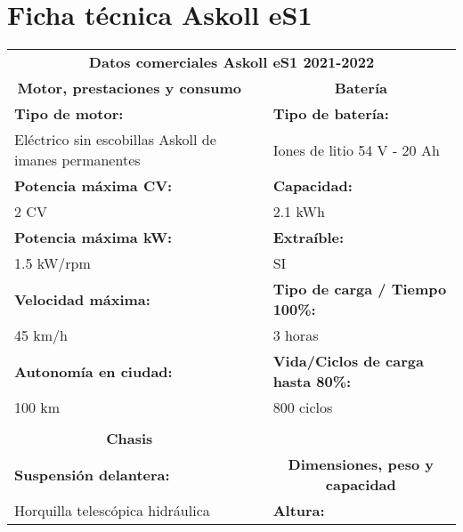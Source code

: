 \newpage
\section{Ficha técnica Askoll eS1}
\label{anexo:ficha tecnica askoll}


\begin{table}[H]
\centering
\begin{tabular}{lll}
\multicolumn{3}{c}{\textbf{Datos comerciales Askoll eS1 2021-2022}}                \\\cline{1-3}
\multicolumn{1}{c}{\textbf{Motor, prestaciones y consumo}} &  & \multicolumn{1}{c}{\textbf{Batería}}                       \\ \cline{1-1} \cline{3-3} 
\textbf{Tipo de motor:}             &  & \textbf{Tipo de batería:}                 \\
Eléctrico sin escobillas Askoll de imanes permanentes      &  & Iones de litio 54 V - 20 Ah                                \\
\textbf{Potencia máxima CV:}        &  & \textbf{Capacidad:}                       \\
2 CV                                &  & 2.1 kWh                                   \\
\textbf{Potencia máxima kW:}        &  & \textbf{Extraíble:}                       \\
1.5 kW/rpm                          &  & SI                                        \\
\textbf{Velocidad máxima:}          &  & \textbf{Tipo de carga / Tiempo 100\%:}    \\
45 km/h                             &  & 3 horas                                   \\
\textbf{Autonomía en ciudad:}       &  & \textbf{Vida/Ciclos de carga hasta 80\%:} \\
100 km                              &  & 800 ciclos                                \\
\multicolumn{1}{c}{\textbf{}}       &  &                                           \\
\multicolumn{1}{c}{\textbf{Chasis}} &  &                                           \\ \cline{1-1}
\textbf{Suspensión delantera:}                             &  & \multicolumn{1}{c}{\textbf{Dimensiones, peso y capacidad}} \\ \cline{3-3} 
Horquilla telescópica hidráulica    &  & \textbf{Altura:}                          \\

\end{tabular}
\end{table}
